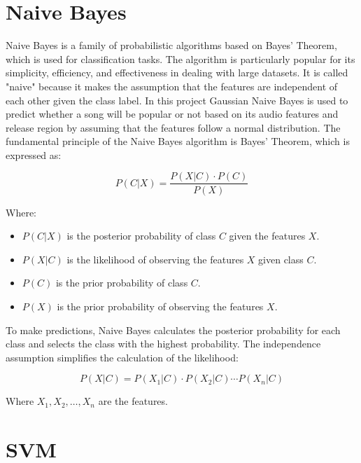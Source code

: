 \section{Naive Bayes}
Naive Bayes is a family of probabilistic algorithms based on Bayes' Theorem, which is used for classification tasks.
The algorithm is particularly popular for its simplicity, efficiency, and effectiveness in dealing with large datasets.
It is called "naive" because it makes the assumption that the features are independent of each other given the class label.
In this project Gaussian Naive Bayes is used to predict whether a song will be popular or not based on its audio features and release region by assuming that
the features follow a normal distribution. The fundamental principle of the Naive Bayes algorithm is Bayes' Theorem, which is expressed as:

\[
P(C | X) = \frac{P(X | C) \cdot P(C)}{P(X)}
\]

Where:
\begin{itemize}
    \item \( P(C | X) \) is the posterior probability of class \( C \) given the features \( X \).
    \item \( P(X | C) \) is the likelihood of observing the features \( X \) given class \( C \).
    \item \( P(C) \) is the prior probability of class \( C \).
    \item \( P(X) \) is the prior probability of observing the features \( X \).
\end{itemize}

To make predictions, Naive Bayes calculates the posterior probability for each class and selects the class with the highest probability. The independence assumption simplifies the calculation of the likelihood:

\[
P(X | C) = P(X_1 | C) \cdot P(X_2 | C) \cdots P(X_n | C)
\]

Where \( X_1, X_2, \ldots, X_n \) are the features.






\section{SVM}